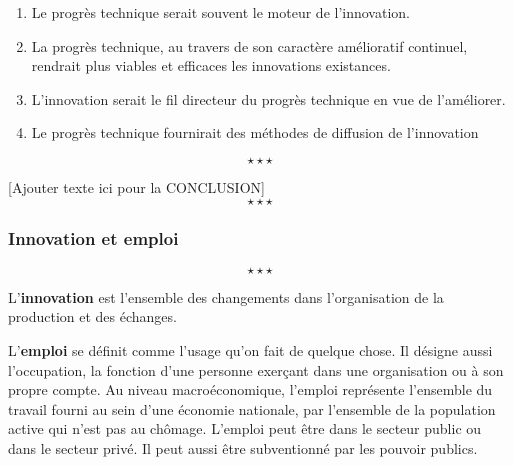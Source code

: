 \begin{enumerate}[label=\Alph*.]
	\begin{enumerate}[label=\theenumi\arabic* -]
		\item {Le progrès technique serait souvent le moteur de l'innovation.}
		\item {La progrès technique, au travers de son caractère amélioratif continuel, rendrait plus viables et efficaces les innovations existances.}
		\item {L'innovation serait le fil directeur du progrès technique en vue de l'améliorer.}
		\item {Le progrès technique fournirait des méthodes de diffusion de l'innovation} 
	\end{enumerate}
\end{enumerate}
$$\star \star \star$$

[Ajouter texte ici pour la CONCLUSION] $$\star \star \star$$


\newpage \begin{center}
	\subsubsection*{Innovation et emploi}
\end{center}
$$\star \star \star$$


%


{L'\textbf{innovation} est l'ensemble des changements dans l'organisation de la production et des échanges.}

{L'\textbf{emploi} se définit comme l'usage qu'on fait de quelque chose. Il désigne aussi l'occupation, la fonction d'une personne exerçant dans une organisation ou à son propre compte. Au niveau macroéconomique, l'emploi représente l'ensemble du travail fourni au sein d'une économie nationale, par l'ensemble de la population active qui n'est pas au chômage. L'emploi peut être dans le secteur public ou dans le secteur privé. Il peut aussi être subventionné par les pouvoir publics.}

